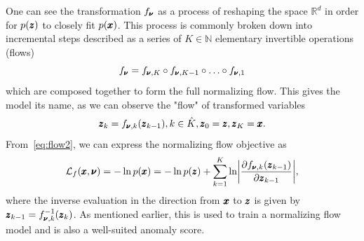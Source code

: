 One can see the transformation $f_{\pmb{{\nu}}}$ as a process of reshaping the space $\mathbb{R}^d$ in order for $p(\pmb{{z}})$ to closely fit $p(\pmb{{x}})$. This process is commonly broken down into incremental steps described as a series of $K \in \mathbb{N}$ elementary invertible operations (flows)
\begin{equation} \label{eq:flow3}
    f_{\pmb{{\nu}}} = f_{\pmb{{\nu}},K} \circ f_{\pmb{{\nu}},K-1} \circ \ldots \circ f_{\pmb{{\nu}},1}
\end{equation}
which are composed together to form the full normalizing flow. This gives the model its name, as we can observe the "flow" of transformed variables
\begin{equation} \label{eq:flow4}
    \pmb{{z}}_k = f_{\pmb{{\nu}},k}(\pmb{{z}}_{k-1}), k \in \hat{K}, \pmb{{z}}_0 = \pmb{{z}}, \pmb{{z}}_K = \pmb{{x}}.
\end{equation}
From~\eqref{eq:flow2}, we can express the normalizing flow objective as
\begin{equation}
    \mathcal{L}_{f} (\vc{x},\vc{\nu}) = - \ln p(\vc{x}) = -\ln p(\vc{z}) + \sum_{k=1}^K \ln \left\vert \frac{\partial f_{\vc{\nu},k}(\vc{z}_{k-1})}{\partial \vc{z}_{k-1}} \right\vert,
\end{equation}
where the inverse evaluation in the direction from $\pmb{{x}}$ to $\pmb{{z}}$ is given by $\pmb{{z}}_{k-1} = f^{-1}_{\pmb{{\nu}},k}(\pmb{{z}}_{k})$. As mentioned earlier, this is used to train a normalizing flow model and is also a well-suited anomaly score.

